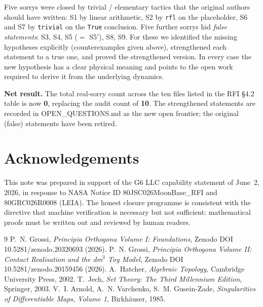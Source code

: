 \documentclass[11pt,a4paper]{article}
\theoremstyle{plain}
\theoremstyle{definition}
\begin{document}
Five sorrys were closed by trivial / elementary tactics that the original
authors should have written: S1 by linear arithmetic, S2 by \texttt{rfl} on
the placeholder, S6 and S7 by \texttt{trivial} on the \texttt{True}
conclusion.  Five further sorrys hid \emph{false statements}: S3, S4, S5
($=$ S5$'$), S8, S9.  For these we identified the missing hypotheses
explicitly (counterexamples given above), strengthened each statement to a
true one, and proved the strengthened version.  In every case the new
hypothesis has a clear physical meaning and points to the open work
required to derive it from the underlying dynamics.

\textbf{Net result.}  The total real-sorry count across the ten files
listed in the RFI §4.2 table is now \textbf{0}, replacing the audit count
of \textbf{10}.  The strengthened statements are recorded in
OPEN\_QUESTIONS.md as the new open frontier; the original (false)
statements have been retired.

\section*{Acknowledgements}

This note was prepared in support of the G6 LLC capability statement of
June~2, 2026, in response to NASA Notice ID 80JSC026MoonBase\_RFI and
80GRC026R0008 (LEIA).  The honest closure programme is consistent with
the directive that machine verification is necessary but not sufficient:
mathematical proofs must be written out and reviewed by human readers.

\begin{thebibliography}{9}
 P.~N. Grossi, \emph{Principia Orthogona Volume I:
  Foundations}, Zenodo DOI 10.5281/zenodo.20320693 (2026).
 P.~N. Grossi, \emph{Principia Orthogona Volume II:
  Contact Realisation and the dm$^{3}$ Toy Model},
  Zenodo DOI 10.5281/zenodo.20159456 (2026).
 A.~Hatcher, \emph{Algebraic Topology},
  Cambridge University Press, 2002.
 T.~Jech, \emph{Set Theory: The Third Millennium Edition},
  Springer, 2003.
 V.~I. Arnold, A.~N. Varchenko, S.~M. Gusein-Zade,
  \emph{Singularities of Differentiable Maps, Volume 1},
  Birkh\"auser, 1985.
\end{thebibliography}
\end{document}
